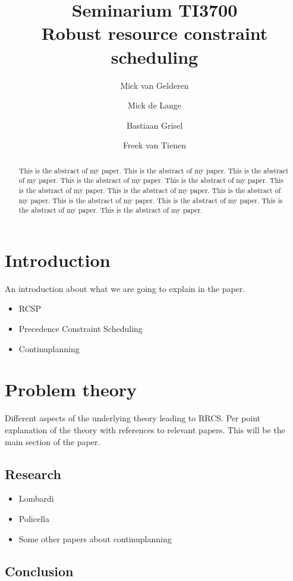 \documentclass{article}
\title{Seminarium TI3700\\Robust resource constraint scheduling}
\author{Mick van Gelderen  \and
    Mick de Lange \and
    Bastiaan Grisel \and
    Freek van Tienen}
\date{}
\begin{document}
\maketitle
\thispagestyle{empty}

\begin{abstract}
This is the abstract of my paper.
This is the abstract of my paper.
This is the abstract of my paper.
This is the abstract of my paper.
This is the abstract of my paper.
This is the abstract of my paper.
This is the abstract of my paper.
This is the abstract of my paper.
This is the abstract of my paper.
This is the abstract of my paper.
This is the abstract of my paper.
This is the abstract of my paper.
\end{abstract}


\section{Introduction}

An introduction about what we are going to explain in the paper.

\begin{itemize}
\item RCSP
\item Precedence Constraint Scheduling
\item Continuplanning
\end{itemize}


\section{Problem theory}

Different aspects of the underlying theory leading to RRCS.  Per point explanation of the theory with references to relevant papers. This will be the main section of the paper.

\subsection{Research}

\begin{itemize}
\item Lombardi
\item Policella
\item Some other papers about continuplanning
\end{itemize}

\subsection{Conclusion}
\end{document}

